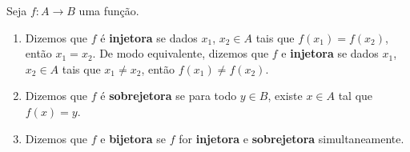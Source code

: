 \begin{definicao}
	Seja $f : A \to B$ uma fun\c{c}\~ao.
	\begin{enumerate}[label={\roman*})]
		\item Dizemos que $f$ \'e \textbf{injetora} se dados $x_1$, $x_2 \in A$ tais que $f(x_1) = f(x_2)$, ent\~ao $x_1 = x_2$. De modo equivalente, dizemos que $f$ e \textbf{injetora} se dados $x_1$, $x_2 \in A$ tais que $x_1 \ne x_2$, ent\~ao $f(x_1) \ne f(x_2)$.

		\item Dizemos que $f$ \'e \textbf{sobrejetora} se para todo $y \in B$, existe $x \in A$ tal que $f(x) = y$.

		\item Dizemos que $f$ e \textbf{bijetora} se $f$ for \textbf{injetora} e \textbf{sobrejetora} simultaneamente.
	\end{enumerate}
\end{definicao}


